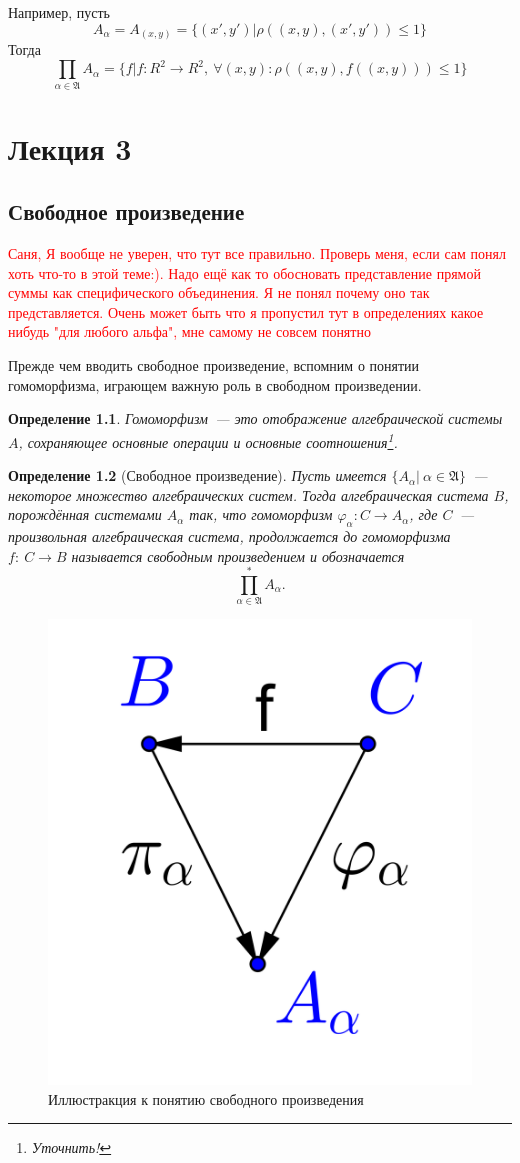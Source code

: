 \documentclass[a4paper, 12pt]{report}
\newtheorem{definition}{Определение}[chapter]
\begin{document}
Например, пусть
\[
A_{\alpha} = A_{(x, y)} = \{(x', y')| \rho((x,y), (x',y')) \leq 1\}
\]
Тогда
\[
\prod_{\alpha \in \mathfrak{A}}A_{\alpha} = \{f| f: R^2 \rightarrow R^2,\ \forall (x,y): \rho((x,y), f((x,y))) \leq 1\}
\]

\chapter{Лекция 3}
\section{Свободное произведение}
\textcolor{red}{Саня, Я вообще не уверен, что тут все правильно. Проверь меня, если сам понял хоть что-то в этой теме:). Надо ещё как то обосновать представление прямой суммы как специфического объединения. Я не понял почему оно так представляется. Очень может быть что я пропустил тут в определениях какое нибудь "для любого альфа", мне самому не совсем понятно}

Прежде чем вводить свободное произведение, вспомним о понятии гомоморфизма, играющем важную роль в свободном произведении.

\begin{definition}
Гомоморфизм~--- это отображение алгебраической системы $A$, сохраняющее основные операции и основные соотношения\footnote{Уточнить!}.
\end{definition}

\begin{definition}[Свободное произведение]
Пусть имеется $\{A_{\alpha}|\ \alpha\in\mathfrak{A}\}$~--- некоторое множество алгебраических систем. Тогда алгебраическая система $B$, порождённая системами $A_{\alpha}$ так, что гомоморфизм $\varphi_{\alpha}: C \rightarrow A_{\alpha}$, где $C$~--- произвольная алгебраическая система, продолжается до гомоморфизма $f:\ C\rightarrow B$ называется свободным произведением и обозначается
\[
\prod_{\alpha\in\mathfrak{A}}^* A_{\alpha}.
\]
\end{definition}

\begin{figure}[htbp]
\centering
\includegraphics[width=0.3\linewidth]{lect3/FreeProduct.png}
\caption{Иллюстракция к понятию свободного произведения}
\label{fig::free_prod}
\end{figure}
\end{document}
